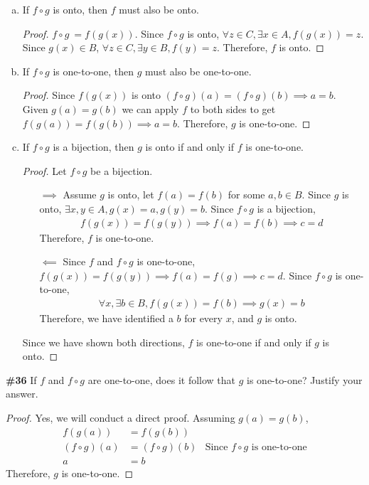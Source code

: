 \documentclass{article}
\newcommand{\problem}[1]{\textbf{\##1}}
\newcommand{\prob}[1]{\problem{#1}}
\begin{document}
\begin{enumerate}[a)]
    \item If \(f \circ g\) is onto, then \(f\) must also be onto.
    \begin{proof}
        \(f \circ g\ = f(g(x))\). Since \(f \circ g\) is onto, \(\forall z \in C, \exists x \in A, f(g(x)) = z\). Since \(g(x) \in B\), \(\forall z \in C, \exists y \in B, f(y) = z\). Therefore, \(f\) is onto.
    \end{proof}
    \item If \(f \circ g\) is one-to-one, then \(g\) must also be one-to-one.
    \begin{proof}
        Since \(f(g(x))\) is onto \((f \circ g)(a) = (f \circ g)(b) \implies a=b\). Given \(g(a) = g(b)\) we can apply \(f\) to both sides to get \(f(g(a)) = f(g(b)) \implies a=b\). Therefore, \(g\) is one-to-one.
    \end{proof}
    \item If \(f \circ g\) is a bijection, then \(g\) is onto if and only if \(f\) is one-to-one.
    \begin{proof}
        Let \(f \circ g\) be a bijection.
        \begin{enumerate}
            \item[\(\implies\)] Assume \(g\) is onto, let \(f(a) = f(b)\) for some \(a,b \in B\). Since \(g\) is onto, \(\exists x,y \in A, g(x) = a, g(y) = b\). Since \(f \circ g\) is a bijection, \begin{align*}
                f(g(x)) = f(g(y)) \implies f(a) = f(b) \implies c = d
            \end{align*} Therefore, \(f\) is one-to-one.
            \item[\(\impliedby\)] Since \(f\) and \(f\circ g\) is one-to-one, \(f(g(x)) = f(g(y)) \implies f(a) = f(g) \implies c = d \). Since \(f \circ g\) is one-to-one,\begin{align*}
                 \forall x, \exists b \in B, f(g(x)) = f(b) \implies g(x) = b
            \end{align*} Therefore, we have identified a \(b\) for every \(x\), and \(g\) is onto.
        \end{enumerate}
        Since we have shown both directions, \(f\) is one-to-one if and only if \(g\) is onto.
    \end{proof}
\end{enumerate}
\pagebreak

\prob{36} If \(f\) and \(f \circ g\) are one-to-one, does it follow that \(g\) is one-to-one? Justify your answer.
\begin{proof}
    Yes, we will conduct a direct proof. Assuming \(g(a) = g(b)\),
    \begin{align*}
        f(g(a)) &= f(g(b))\\
        (f \circ g)(a) &= (f \circ g)(b)&\text{Since }f\circ g \text{ is one-to-one}\\
        a &= b
    \end{align*}
    Therefore, \(g\) is one-to-one.
\end{proof}
\pagebreak
\end{document}
